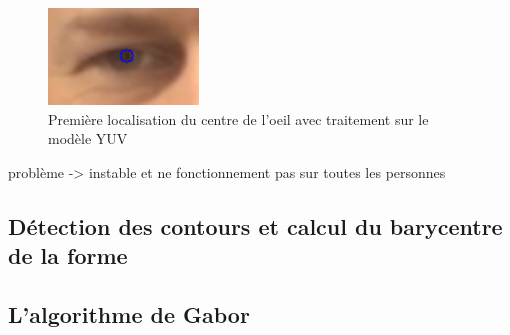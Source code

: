 \begin{figure}[H]
 \center
 \includegraphics[width=4cm]{image/localisation1.png}
 \caption{Première localisation du centre de l'oeil avec traitement sur le modèle YUV}
\end{figure}

problème -> instable et ne fonctionnement pas sur toutes les personnes

\subsection{Détection des contours et calcul du barycentre de la forme}

\subsection{L'algorithme de Gabor}